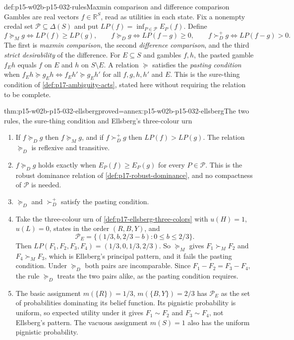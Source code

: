 \begin{hbdefinition}{def:p15-w02b-p15-032-rules}{Maxmin comparison and difference comparison}
Gambles are real vectors \(f\in\mathbb R^S\), read as utilities in each
state. Fix a nonempty credal set \(\mathcal P\subseteq\Delta(S)\) and put
\(LP(f)=\inf_{P\in\mathcal P}E_P(f)\). Define
\[
 f\succeq_M g\iff LP(f)\geq LP(g),\qquad
 f\succeq_D g\iff LP(f-g)\geq0,\qquad
 f\succ_D^{+} g\iff LP(f-g)>0.
\]
The first is \emph{maxmin comparison}, the second \emph{difference
comparison}, and the third \emph{strict desirability} of the difference.
For \(E\subseteq S\) and gambles \(f,h\), the pasted gamble \(f_Eh\) equals
\(f\) on \(E\) and \(h\) on \(S\setminus E\). A relation \(\succeq\)
satisfies the \emph{pasting condition} when
\(f_Eh\succeq g_Eh\iff f_Eh'\succeq g_Eh'\) for all \(f,g,h,h'\) and
\(E\). This is the sure-thing condition of
\cref{def:p17-ambiguity-acts}, stated here without requiring the relation
to be complete.
\end{hbdefinition}

\begin{hbtheorem}{thm:p15-w02b-p15-032-ellsberg}{proved=annex:p15-w02b-p15-032-ellsberg}{The two rules, the sure-thing condition and Ellsberg's three-colour urn}
\begin{enumerate}
\item If \(f\succeq_D g\) then \(f\succeq_M g\), and if \(f\succ_D^{+}g\)
  then \(LP(f)>LP(g)\). The relation \(\succeq_D\) is reflexive and
  transitive.
\item \(f\succeq_D g\) holds exactly when \(E_P(f)\geq E_P(g)\) for every
  \(P\in\mathcal P\). This is the robust dominance relation of
  \cref{def:p17-robust-dominance}, and no compactness of \(\mathcal P\)
  is needed.
\item \(\succeq_D\) and \(\succ_D^{+}\) satisfy the pasting condition.
\item Take the three-colour urn of \cref{def:p17-ellsberg-three-colors}
  with \(u(H)=1\), \(u(L)=0\), states in the order \((R,B,Y)\), and
  \[
   \mathcal P_E=\{(1/3,b,2/3-b):0\leq b\leq2/3\}.
  \]
  Then \(LP(F_1,F_2,F_3,F_4)=(1/3,0,1/3,2/3)\). So \(\succeq_M\) gives
  \(F_1\succ_M F_2\) and \(F_4\succ_M F_3\), which is Ellsberg's principal
  pattern, and it fails the pasting condition. Under \(\succeq_D\) both
  pairs are incomparable. Since \(F_1-F_2=F_3-F_4\), the rule \(\succeq_D\)
  treats the two pairs alike, as the pasting condition requires.
\item The basic assignment \(m(\{R\})=1/3\), \(m(\{B,Y\})=2/3\) has
  \(\mathcal P_E\) as the set of probabilities dominating its belief
  function. Its pignistic probability is uniform, so expected utility
  under it gives \(F_1\sim F_2\) and \(F_3\sim F_4\), not Ellsberg's pattern.
  The vacuous assignment \(m(S)=1\) also has the uniform pignistic
  probability.
\end{enumerate}
\end{hbtheorem}

